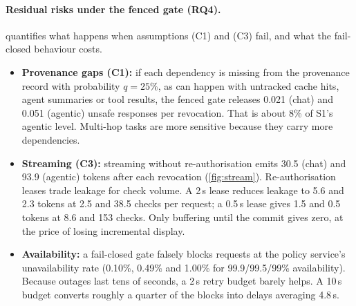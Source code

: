 \documentclass[10pt]{article}
\begin{document}
\paragraph{Residual risks under the fenced gate (RQ4).}
 quantifies what happens when assumptions (C1) and (C3) fail, and what the fail-closed behaviour costs.
\begin{itemize}\itemsep0pt
\item \textbf{Provenance gaps (C1):} if each dependency is missing from the provenance record with probability $q{=}25\%$, as can happen with untracked cache hits, agent summaries or tool results, the fenced gate releases 0.021 (chat) and 0.051 (agentic) unsafe responses per revocation. That is about 8\% of S1's agentic level. Multi-hop tasks are more sensitive because they carry more dependencies.
\item \textbf{Streaming (C3):} streaming without re-authorisation emits 30.5 (chat) and 93.9 (agentic) tokens after each revocation (\cref{fig:stream}). Re-authorisation leases trade leakage for check volume. A 2\,s lease reduces leakage to 5.6 and 2.3 tokens at 2.5 and 38.5 checks per request; a 0.5\,s lease gives 1.5 and 0.5 tokens at 8.6 and 153 checks. Only buffering until the commit gives zero, at the price of losing incremental display.
\item \textbf{Availability:} a fail-closed gate falsely blocks requests at the policy service's unavailability rate (0.10\%, 0.49\% and 1.00\% for 99.9/99.5/99\% availability). Because outages last tens of seconds, a 2\,s retry budget barely helps. A 10\,s budget converts roughly a quarter of the blocks into delays averaging 4.8\,s.
\end{itemize}
\end{document}
